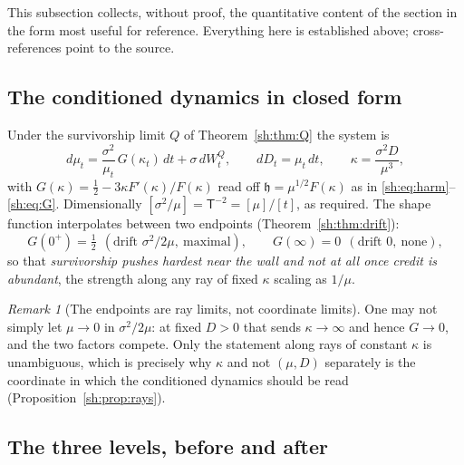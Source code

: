 \documentclass[11pt]{article}
\numberwithin{equation}{section}
\theoremstyle{plain}
\theoremstyle{definition}
\theoremstyle{remark}
\newtheorem{remark}[theorem]{Remark}
\newcommand{\hm}{\mathfrak{h}}
\begin{document}
\label{sh:sub:sheet}

This subsection collects, without proof, the quantitative content of the
section in the form most useful for reference. Everything here is
established above; cross-references point to the source.

\subsection{The conditioned dynamics in closed form}
\label{sh:subsub:sheet:dyn}

Under the survivorship limit $Q$ of Theorem~\ref{sh:thm:Q} the system is
\begin{equation}\label{sh:eq:sheet}
d\mu_t=\frac{\sigma^2}{\mu_t}\,G(\kappa_t)\,dt+\sigma\,dW^Q_t,
\qquad
dD_t=\mu_t\,dt,
\qquad
\kappa=\frac{\sigma^2D}{\mu^3},
\end{equation}
with $G(\kappa)=\tfrac12-3\kappa F'(\kappa)/F(\kappa)$ read off
$\hm=\mu^{1/2}F(\kappa)$ as in \eqref{sh:eq:harm}--\eqref{sh:eq:G}.
Dimensionally $[\sigma^2/\mu]=\mathsf T^{-2}=[\mu]/[t]$, as required. The
shape function interpolates between two endpoints
(Theorem~\ref{sh:thm:drift}):
\[
G(0^+)=\tfrac12\ \ (\text{drift }\sigma^2/2\mu,\ \text{maximal}),
\qquad
G(\infty)=0\ \ (\text{drift }0,\ \text{none}),
\]
so that \emph{survivorship pushes hardest near the wall and not at all
once credit is abundant}, the strength along any ray of fixed $\kappa$
scaling as $1/\mu$.

\begin{remark}[The endpoints are ray limits, not coordinate limits]
\label{sh:rem:raylimit}
One may not simply let $\mu\to0$ in $\sigma^2/2\mu$: at fixed $D>0$ that
sends $\kappa\to\infty$ and hence $G\to0$, and the two factors compete.
Only the statement along rays of constant $\kappa$ is unambiguous, which
is precisely why $\kappa$ and not $(\mu,D)$ separately is the coordinate
in which the conditioned dynamics should be read
(Proposition~\ref{sh:prop:rays}).
\end{remark}

\subsection{The three levels, before and after}
\label{sh:subsub:sheet:levels}
\end{document}
